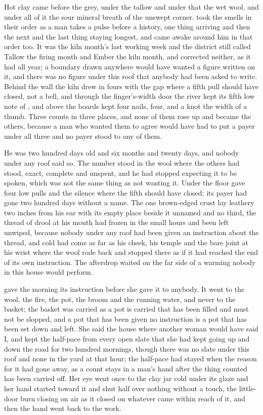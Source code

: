 
Hot clay came before the grey, under the tallow and under that the wet wool, and under all of it the sour mineral breath of the unswept corner.  took the smells in their order as a man takes a pulse before a history, one thing arriving and then the next and the last thing staying longest, and  came awake around him in that order too. It was the kiln month's last working week and the district still called Tallow the firing month and Ember the kiln month, and corrected neither, as it had all year; a boundary drawn anywhere would have wanted a figure written on it, and there was no figure under this roof that anybody had been asked to write. Behind the wall the kiln drew in fours with the gap where a fifth pull should have closed, not a bell, and through the finger's-width door the river kept its fifth low note of , and above  the boards kept four nails, four, and a knot the width of a thumb. Three counts in three places, and none of them rose up and became the others, because a man who wanted them to agree would have had to put a payer under all three and no payer stood to any of them.

He was two hundred days old and six months and twenty days, and nobody under any roof said so. The number stood in the wool where the others had stood, exact, complete and unspent, and he had stopped expecting it to be spoken, which was not the same thing as not wanting it. Under the floor  gave four low pulls and the silence where the fifth should have closed; its payer had gone two hundred days without a name. The one brown-edged crust lay leathery two inches from his ear with its empty place beside it unnamed and no third, the thread of drool at his mouth had frozen in the small hours and been left unwiped, because nobody under any roof had been given an instruction about the thread, and cold had come as far as his cheek, his temple and the bare joint at his wrist where the wool rode back and stopped there as if it had reached the end of its own instruction. The afterdrop waited on the far side of a warming nobody in this house would perform.

 gave the morning its instruction before she gave it to anybody. It went to the wool, the fire, the pot, the broom and the running water, and never to the basket; the basket was carried as a pot is carried that has been filled and must not be slopped, and a pot that has been given no instruction is a pot that has been set down and left. She said the house where another woman would have said I, and kept the half-pace from every open slate that she had kept going up and down the road for two hundred mornings, though there was no slate under this roof and none in the yard at that hour; the half-pace had stayed when the reason for it had gone away, as a count stays in a man's hand after the thing counted has been carried off. Her eye went once to the clay jar cold under its glaze and her hand started toward it and shut half over nothing without a touch, the little-door burn closing on air as it closed on whatever came within reach of it, and then the hand went back to the work.

